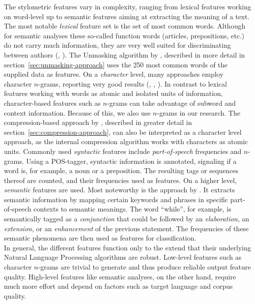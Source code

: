 The stylometric features vary in complexity, ranging from lexical features working on word-level up to semantic features aiming at extracting the meaning of a text.
The most notable \textit{lexical} feature set is the set of most common words.
Although for semantic analyses these so-called function words (articles, prepositions, etc.) do not carry much information, they are very well suited for discriminating between authors (\cite{argamon2005measuring}, \cite{burrows1987word}).
The Unmasking algorithm by \cite{koppel2004unmasking}, described in more detail in section~\ref{sec:unmasking-approach} uses the 250 most common words of the supplied data as features.
On a \textit{character} level, many approaches employ character $n$-grams, reporting very good results (\cite{peng2003language}, \cite{kevselj2003n}, \cite{stamatatos2006ensemble}).
In contrast to lexical features working with words as atomic and isolated units of information, character-based features such as $n$-grams can take advantage of subword and context information.
Because of this, we also use $n$-grams in our research.
The compression-based approach by \cite{teahan2003compression}, described in greater detail in section~\ref{sec:compression-approach}, can also be interpreted as a character level approach, as the internal compression algorithm works with characters as atomic units.
Commonly used \textit{syntactic} features include \textit{part-of-speech} frequencies and $n$-grams.
Using a POS-tagger, syntactic information is annotated, signaling if a word is, for example, a noun or a preposition.
The resulting tags or sequences thereof are counted, and their frequencies used as features.
On a higher level, \textit{semantic} features are used.
Most noteworthy is the approach by \cite{argamon2007stylistic}.
It extracts semantic information by mapping certain keywords and phrases in specific part-of-speech contexts to semantic meanings.
The word ``while'', for example, is semantically tagged as a \textit{conjunction} that could be followed by an \textit{elaboration}, an \textit{extension}, or an \textit{enhancement} of the previous statement.
The frequencies of these semantic phenomena are then used as features for classification.\\
In general, the different features function only to the extend that their underlying Natural Language Processing algorithms are robust.
Low-level features such as character $n$-grams are trivial to generate and thus produce reliable output feature quality.
High-level features like semantic analyses, on the other hand, require much more effort and depend on factors such as target language and corpus quality.\\

